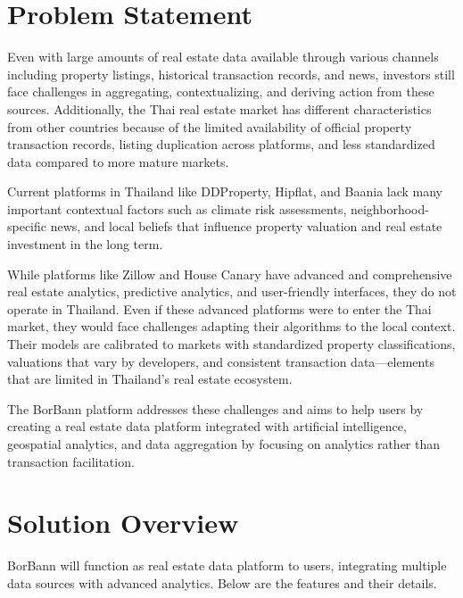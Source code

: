 \section{Problem Statement}

Even with large amounts of real estate data available through various channels including
property listings, historical transaction records, and news, investors still
face challenges in aggregating, contextualizing, and deriving action from these
sources. Additionally, the Thai real estate market has different characteristics
from other countries because of the limited availability of official property
transaction records, listing duplication across platforms, and less standardized
data compared to more mature markets.

Current platforms in Thailand like DDProperty, Hipflat, and Baania lack many
important contextual factors such as climate risk assessments, neighborhood-specific
news, and local beliefs that influence property valuation and real estate
investment in the long term.

While platforms like Zillow and House Canary have advanced and comprehensive
real estate analytics, predictive analytics, and user-friendly interfaces, they do
not operate in Thailand. Even if these advanced platforms were to enter the Thai
market, they would face challenges adapting their algorithms to the local context.
Their models are calibrated to markets with standardized property
classifications, valuations that vary by developers, and consistent transaction
data—elements that are limited in Thailand's real estate ecosystem.

The BorBann platform addresses these challenges and aims to help users by
creating a real estate data platform integrated with artificial intelligence, geospatial
analytics, and data aggregation by focusing on analytics rather than transaction
facilitation.

\section{Solution Overview}

BorBann will function as real estate data platform to users, integrating multiple
data sources with advanced analytics. Below are the features and their details.

